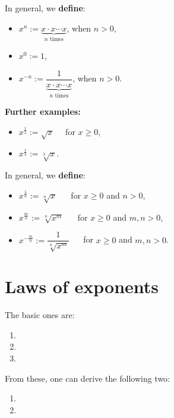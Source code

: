 \documentclass[
  12pt,
  oneside]{book}
\providecommand{\tightlist}{%
  \setlength{\itemsep}{0pt}\setlength{\parskip}{0pt}}
\theoremstyle{definition}
\theoremstyle{definition}
\theoremstyle{definition}
\theoremstyle{definition}
\theoremstyle{remark}
\begin{document}
In general, we \textbf{define}:

\begin{itemize}
\tightlist
\item
  \(x^n := \underbrace{x\cdot x\cdots x}_{n\text{ times}}\), when \(n>0\),
\item
  \(x^0 := 1\),
\item
  \(x^{-n} := \dfrac{1}{\underbrace{x\cdot x\cdots x}_{n\text{ times}}}\), when \(n>0\).
\end{itemize}

\textbf{Further examples:}

\begin{itemize}
\tightlist
\item
  \(x^{\frac{1}{2}} := \sqrt{x}\)~~ for \(x\geq 0\),
\item
  \(x^{\frac{1}{3}} := \sqrt[3]{x}\).
\end{itemize}

In general, we \textbf{define}:

\begin{itemize}
\tightlist
\item
  \(x^{\frac{1}{n}} := \sqrt[n]{x}\) ~~ for \(x\geq0\) and \(n>0\),
\item
  \(x^{\frac{m}{n}} := \sqrt[n]{x^m}\) ~~ for \(x\geq0\) and \(m,n>0\),
\item
  \(x^{-\frac{m}{n}} := \dfrac{1}{\sqrt[n]{x^m}}\) ~~ for \(x\geq0\) and \(m,n>0\).
\end{itemize}

\section{Laws of exponents}\label{laws-of-exponents}

The basic ones are:

\begin{enumerate}
\def\labelenumi{\arabic{enumi}.}
\item
\item
\item
\end{enumerate}

From these, one can derive the following two:

\begin{enumerate}
\def\labelenumi{\arabic{enumi}.}
\setcounter{enumi}{3}
\item
\item
\end{enumerate}
\end{document}
